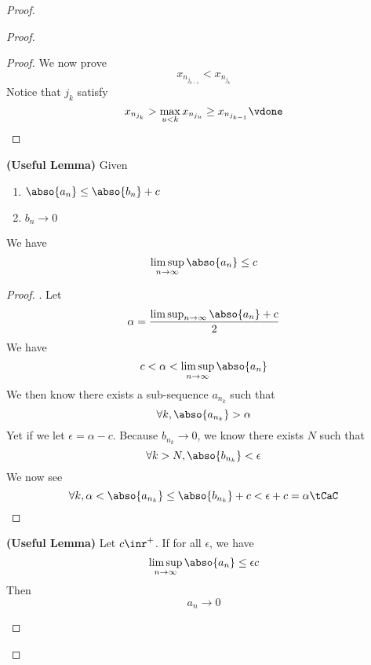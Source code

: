 \documentclass{report}
\begin{document}
\begin{proof}
\begin{proof}
\begin{proof}
We now prove 
\begin{equation*}
x_{n_{j_{k-1}}}<x_{n_{j_k}}
\end{equation*}
Notice that $j_k$ satisfy
 \begin{equation*}
x_{n_{j_k}}>\max_{u<k}x_{n_{j_u}}\geq x_{n_{j_{k-1}}}\vdone
\end{equation*}
\end{proof}
\begin{theorem}
\label{4.4.14}
\textbf{(Useful Lemma)} Given 
\begin{enumerate}[label=(\alph*)]
  \item $\abso{a_n}\leq \abso{b_n}+c$
  \item $b_n\to 0$
\end{enumerate}
We have 
\begin{equation*}
\limsup_{n\to\infty} \abso{a_n}\leq c
\end{equation*}
\end{theorem}
\begin{proof}
. Let 
\begin{equation*}
\alpha  = \frac{\limsup_{n\to\infty}  \abso{a_n}+c}{2}
\end{equation*}
We have 
\begin{equation*}
c<\alpha <\limsup_{n\to\infty} \abso{a_n}
\end{equation*}
We then know there exists a sub-sequence $a_{n_k}$ such that 
\begin{equation*}
  \forall k, \abso{a_{n_k}} > \alpha  
\end{equation*}
Yet if we let $\epsilon =\alpha -c$. Because $b_{n_k} \to 0$, we know there exists $N$ such that 
\begin{equation*}
\forall k>N, \abso{b_{n_k}}<\epsilon 
\end{equation*}
We now see 
\begin{equation*}
\forall k, \alpha <\abso{a_{n_k}}\leq \abso{b_{n_k}}+c< \epsilon +c=\alpha \tCaC
\end{equation*}
\end{proof}
\begin{theorem}
\label{4.4.15}
\textbf{(Useful Lemma)} Let $c\inr^+$. If for all $\epsilon $, we have
\begin{equation*}
\limsup_{n\to\infty} \abso{a_n}\leq \epsilon c
\end{equation*}
Then 
\begin{equation*}
a_n \to 0
\end{equation*}
\end{theorem}

\end{proof}
\end{proof}
\end{document}
